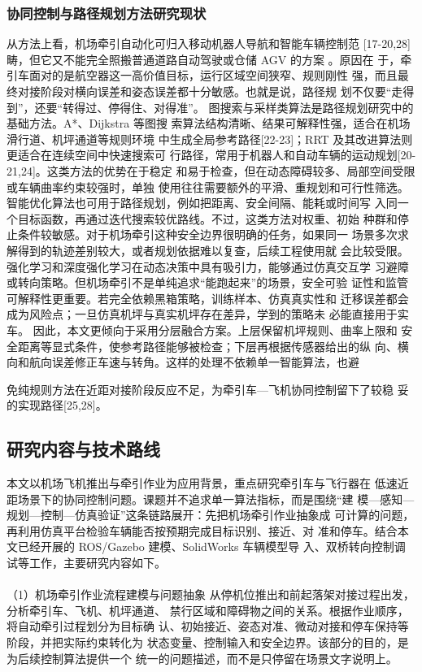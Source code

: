\subsubsection{协同控制与路径规划方法研究现状}
从方法上看，机场牵引自动化可归入移动机器人导航和智能车辆控制范
[17-20,28]
畴，但它又不能完全照搬普通道路自动驾驶或仓储 AGV 的方案                。原因在
于，牵引车面对的是航空器这一高价值目标，运行区域空间狭窄、规则刚性
强，而且最终对接阶段对横向误差和姿态误差都十分敏感。也就是说，路径规
划不仅要“走得到”，还要“转得过、停得住、对得准”。
图搜索与采样类算法是路径规划研究中的基础方法。A*、Dijkstra 等图搜
索算法结构清晰、结果可解释性强，适合在机场滑行道、机坪通道等规则环境
中生成全局参考路径[22-23]；RRT 及其改进算法则更适合在连续空间中快速搜索可
行路径，常用于机器人和自动车辆的运动规划[20-21,24]。这类方法的优势在于稳定
和易于检查，但在动态障碍较多、局部空间受限或车辆曲率约束较强时，单独
使用往往需要额外的平滑、重规划和可行性筛选。
智能优化算法也可用于路径规划，例如把距离、安全间隔、能耗或时间写
入同一个目标函数，再通过迭代搜索较优路线。不过，这类方法对权重、初始
种群和停止条件较敏感。对于机场牵引这种安全边界很明确的任务，如果同一
场景多次求解得到的轨迹差别较大，或者规划依据难以复查，后续工程使用就
会比较受限。
强化学习和深度强化学习在动态决策中具有吸引力，能够通过仿真交互学
习避障或转向策略。但机场牵引不是单纯追求“能跑起来”的场景，安全可验
证性和监管可解释性更重要。若完全依赖黑箱策略，训练样本、仿真真实性和
迁移误差都会成为风险点；一旦仿真机坪与真实机坪存在差异，学到的策略未
必能直接用于实车。
因此，本文更倾向于采用分层融合方案。上层保留机坪规则、曲率上限和
安全距离等显式条件，使参考路径能够被检查；下层再根据传感器给出的纵
向、横向和航向误差修正车速与转角。这样的处理不依赖单一智能算法，也避







免纯规则方法在近距对接阶段反应不足，为牵引车—飞机协同控制留下了较稳
妥的实现路径[25,28]。
\subsection{研究内容与技术路线}
本文以机场飞机推出与牵引作业为应用背景，重点研究牵引车与飞行器在
低速近距场景下的协同控制问题。课题并不追求单一算法指标，而是围绕“建
模—感知—规划—控制—仿真验证”这条链路展开：先把机场牵引作业抽象成
可计算的问题，再利用仿真平台检验车辆能否按预期完成目标识别、接近、对
准和停车。结合本文已经开展的 ROS/Gazebo 建模、SolidWorks 车辆模型导
入、双桥转向控制调试等工作，主要研究内容如下。
\paragraph{} （1）机场牵引作业流程建模与问题抽象
从停机位推出和前起落架对接过程出发，分析牵引车、飞机、机坪通道、
禁行区域和障碍物之间的关系。根据作业顺序，将自动牵引过程划分为目标确
认、初始接近、姿态对准、微动对接和停车保持等阶段，并把实际约束转化为
状态变量、控制输入和安全边界。该部分的目的，是为后续控制算法提供一个
统一的问题描述，而不是只停留在场景文字说明上。
